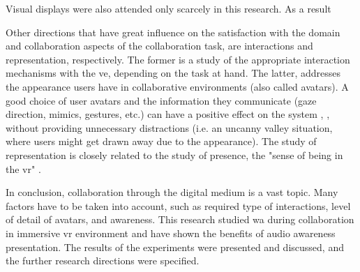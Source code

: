 Visual displays were also attended only scarcely in this research. As a result 

Other directions that have great influence on the satisfaction with the domain and collaboration aspects of the collaboration task, are interactions and representation, respectively. The former is a study of the appropriate interaction mechanisms with the \gls{ve}, depending on the task at hand. The latter, addresses the appearance users have in collaborative environments (also called avatars). A good choice of user avatars and the information they communicate (gaze direction, mimics, gestures, etc.) can have a positive effect on the system \parencite{greenwald_cocoverse_nodate}, \parencite{lena_real-time_nodate}, without providing unnecessary distractions (i.e. an uncanny valley situation, where users might get drawn away due to the appearance). The study of representation is closely related to the study of presence, the "sense of being in the \gls{vr}" \parencite{schubert_experience_2001}.

In conclusion, collaboration through the digital medium is a vast topic. Many factors have to be taken into account, such as required type of interactions, level of detail of avatars, and awareness. This research studied \gls{wa} during collaboration in immersive \gls{vr} environment and have shown the benefits of audio awareness presentation. The results of the experiments were presented and discussed, and the further research directions were specified.
% 






